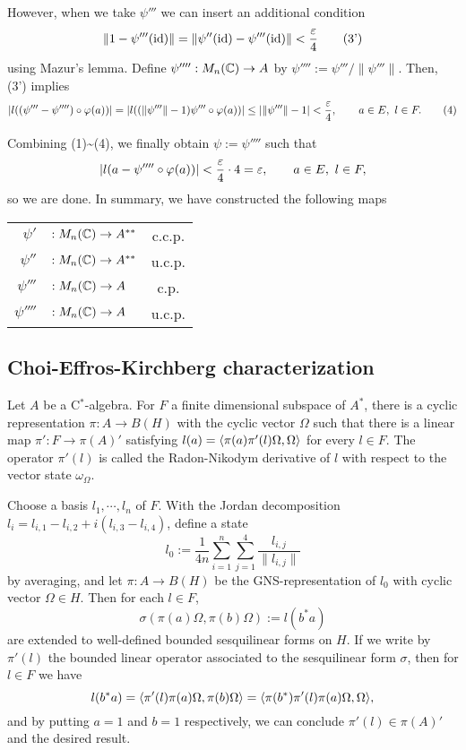 \documentclass{../../../small}
\begin{document}
\begin{pf}
However, when we take $\psi'''$ we can insert an additional condition
\[\|1-\psi'''(\operatorname{id})\|=\|\psi''(\operatorname{id})-\psi'''(\operatorname{id})\|<\frac{\varepsilon}4\tag{3'}\]
using Mazur's lemma.
Define $\psi'''':M_n(\mathbb{C})\to A$ by $\psi'''':=\psi'''/\|\psi'''\|$.
Then, (3') implies
\[|l((\psi'''-\psi'''')\circ\varphi(a))|=|l((\|\psi'''\|-1)\psi'''\circ\varphi(a))|\le|\|\psi'''\|-1|<\frac{\varepsilon}4,\qquad a\in E,\ l\in F.\tag{4}\]

Combining (1)\sim(4), we finally obtain $\psi:=\psi''''$ such that
\[|l(a-\psi''''\circ\varphi(a))|<\frac{\varepsilon}4\cdot4=\varepsilon,\qquad a\in E,\ l\in F,\]
so we are done.
In summary, we have constructed the following maps
\begin{center}
\begin{tabular}{rlc}
$\psi'$&$:M_n(\mathbb{C})\to A^{**}$ & c.c.p.\\
$\psi''$&$:M_n(\mathbb{C})\to A^{**}$ & u.c.p.\\
$\psi'''$&$:M_n(\mathbb{C})\to A$ & c.p.\\
$\psi''''$&$:M_n(\mathbb{C})\to A$ & u.c.p.
\end{tabular}
\end{center}
\end{pf}


\subsection{Choi-Effros-Kirchberg characterization}


\begin{lem}
Let $A$ be a C$^*$-algebra.
For $F$ a finite dimensional subspace of $A^*$, there is a cyclic representation $\pi:A\to B(H)$ with the cyclic vector $\Omega$ such that there is a linear map $\pi':F\to\pi(A)'$ satisfying $l(a)=\langle\pi(a)\pi'(l)\Omega,\Omega\rangle$ for every $l\in F$.
The operator $\pi'(l)$ is called the Radon-Nikodym derivative of $l$ with respect to the vector state $\omega_\Omega$.
\end{lem}
\begin{pf}
Choose a basis $l_1,\cdots,l_n$ of $F$.
With the Jordan decomposition $l_i=l_{i,1}-l_{i,2}+i(l_{i,3}-l_{i,4})$, define a state
\[l_0:=\frac1{4n}\sum_{i=1}^n\sum_{j=1}^4\frac{l_{i,j}}{\|l_{i,j}\|}\]
by averaging, and let $\pi:A\to B(H)$ be the GNS-representation of $l_0$ with cyclic vector $\Omega\in H$.
Then for each $l\in F$,
\[\sigma(\pi(a)\Omega,\pi(b)\Omega):=l(b^*a)\]
are extended to well-defined bounded sesquilinear forms on $H$.
If we write by $\pi'(l)$ the bounded linear operator associated to the sesquilinear form $\sigma$, then for $l\in F$ we have
\[l(b^*a)=\langle\pi'(l)\pi(a)\Omega,\pi(b)\Omega\rangle=\langle\pi(b^*)\pi'(l)\pi(a)\Omega,\Omega\rangle,\]
and by putting $a=1$ and $b=1$ respectively, we can conclude $\pi'(l)\in\pi(A)'$ and the desired result.
\end{pf}
\end{document}
